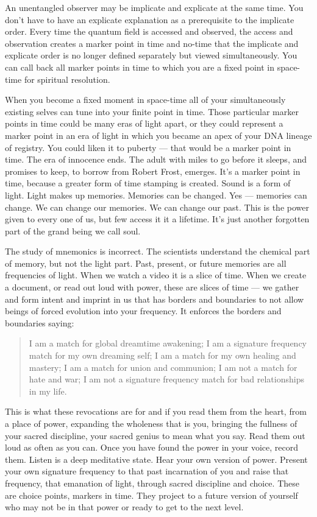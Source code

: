 \documentclass[letterpaper,11pt,twoside,titlepage,onecolumn,openany]{book}
\begin{document}
An unentangled observer may be implicate and explicate at the same time.
You don't have to have an explicate explanation as a prerequisite to the
implicate order. Every time the quantum field is accessed and observed,
the access and observation creates a marker point in time and no-time
that the implicate and explicate order is no longer defined separately
but viewed simultaneously. You can call back all marker points in time
to which you are a fixed point in space-time for spiritual resolution.

When you become a fixed moment in space-time all of your simultaneously
existing selves can tune into your finite point in time. Those
particular marker points in time could be many eras of light apart, or
they could represent a marker point in an era of light in which you
became an apex of your DNA lineage of registry. You could liken it to
puberty --- that would be a marker point in time. The era of innocence
ends. The adult with miles to go before it sleeps, and promises to keep,
to borrow from Robert Frost, emerges. It's a marker point in time,
because a greater form of time stamping is created. Sound is a form of
light. Light makes up memories. Memories can be changed. Yes ---
memories can change. We can change our memories. We can change our past.
This is the power given to every one of us, but few access it it a
lifetime. It's just another forgotten part of the grand being we call
soul.

The study of mnemonics is incorrect. The scientists understand the
chemical part of memory, but not the light part. Past, present, or
future memories are all frequencies of light. When we watch a video it
is a slice of time. When we create a document, or read out loud with
power, these are slices of time --- we gather and form intent and
imprint in us that has borders and boundaries to not allow beings of
forced evolution into your frequency. It enforces the borders and
boundaries saying:

\begin{quote}
I am a match for global dreamtime awakening; I am a signature frequency
match for my own dreaming self; I am a match for my own healing and
mastery; I am a match for union and communion; I am not a match for hate
and war; I am not a signature frequency match for bad relationships in
my life.
\end{quote}

This is what these revocations are for and if you read them from the
heart, from a place of power, expanding the wholeness that is you,
bringing the fullness of your sacred discipline, your sacred genius to
mean what you say. Read them out loud as often as you can. Once you have
found the power in your voice, record them. Listen is a deep meditative
state. Hear your own version of power. Present your own signature
frequency to that past incarnation of you and raise that frequency, that
emanation of light, through sacred discipline and choice. These are
choice points, markers in time. They project to a future version of
yourself who may not be in that power or ready to get to the next level.
\end{document}

